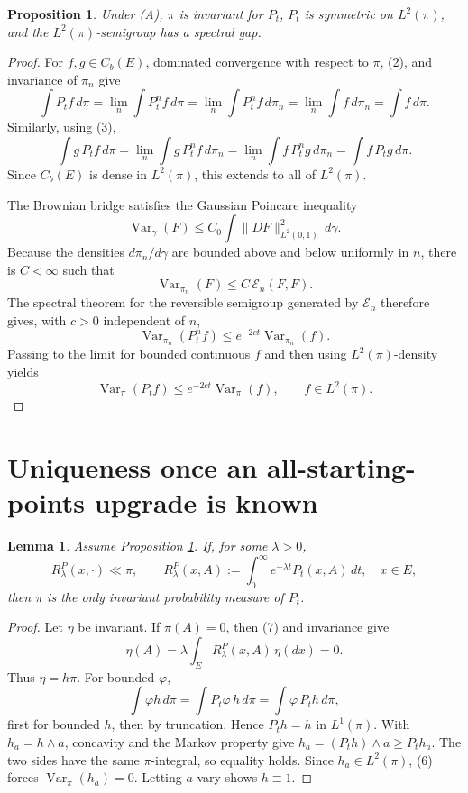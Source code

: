\documentclass[12pt]{article}
\newtheorem{lemma}{Lemma}
\newtheorem{proposition}{Proposition}
\newcommand{\1}{\mathbf 1}
\newcommand{\cE}{\mathcal E}
\newcommand{\Var}{\operatorname{Var}}
\begin{document}
\begin{proposition}\label{prop:limit}
Under (A), \(\pi\) is invariant for \(P_t\), \(P_t\) is symmetric on
\(L^2(\pi)\), and the \(L^2(\pi)\)-semigroup has a spectral gap.
\end{proposition}

\begin{proof}
For \(f,g\in C_b(E)\), dominated convergence with respect to \(\pi\),
(2), and invariance of \(\pi_n\) give
\[
 \int P_tf\,d\pi
 =\lim_n\int P_t^nf\,d\pi
  =\lim_n\int P_t^nf\,d\pi_n
  =\lim_n\int f\,d\pi_n
  =\int f\,d\pi .
\]
Similarly, using (3),
\[
 \int g\,P_tf\,d\pi
 =\lim_n\int g\,P_t^nf\,d\pi_n
  =\lim_n\int f\,P_t^ng\,d\pi_n
  =\int f\,P_tg\,d\pi .
\]
Since \(C_b(E)\) is dense in \(L^2(\pi)\), this extends to all of
\(L^2(\pi)\).

The Brownian bridge satisfies the Gaussian Poincare inequality
\[
     \Var_\gamma(F)\le C_0\int\|DF\|_{L^2(0,1)}^2\,d\gamma .
\]
Because the densities \(d\pi_n/d\gamma\) are bounded above and below
uniformly in \(n\), there is \(C<\infty\) such that
\[
     \Var_{\pi_n}(F)\le C\,\cE_n(F,F).             \tag{4}
\]
The spectral theorem for the reversible semigroup generated by
\(\cE_n\) therefore gives, with \(c>0\) independent of \(n\),
\[
     \Var_{\pi_n}(P_t^n f)
       \le e^{-2ct}\Var_{\pi_n}(f).                \tag{5}
\]
Passing to the limit for bounded continuous \(f\) and then using
\(L^2(\pi)\)-density yields
\[
     \Var_{\pi}(P_t f)\le e^{-2ct}\Var_\pi(f),
     \qquad f\in L^2(\pi).                         \tag{6}
\]
\end{proof}

\section*{Uniqueness once an all-starting-points upgrade is known}

\begin{lemma}\label{lem:criterion}
Assume Proposition \ref{prop:limit}.  If, for some \(\lambda>0\),
\[
     R_\lambda^P(x,\cdot)\ll \pi,\qquad
     R_\lambda^P(x,A):=\int_0^\infty e^{-\lambda t}P_t(x,A)\,dt,
     \quad x\in E,                                  \tag{7}
\]
then \(\pi\) is the only invariant probability measure of \(P_t\).
\end{lemma}

\begin{proof}
Let \(\eta\) be invariant.  If \(\pi(A)=0\), then (7) and invariance give
\[
   \eta(A)=\lambda\int_E R_\lambda^P(x,A)\,\eta(dx)=0.
\]
Thus \(\eta=h\pi\).  For bounded \(\varphi\),
\[
 \int \varphi h\,d\pi=\int P_t\varphi\,h\,d\pi
   =\int \varphi\,P_t h\,d\pi ,
\]
first for bounded \(h\), then by truncation.  Hence \(P_t h=h\) in
\(L^1(\pi)\).  With \(h_a=h\wedge a\), concavity and the Markov property
give \(h_a=(P_th)\wedge a\ge P_t h_a\).  The two sides have the same
\(\pi\)-integral, so equality holds.  Since \(h_a\in L^2(\pi)\), (6)
forces \(\Var_\pi(h_a)=0\).  Letting \(a\) vary shows \(h\equiv1\).
\end{proof}
\end{document}
